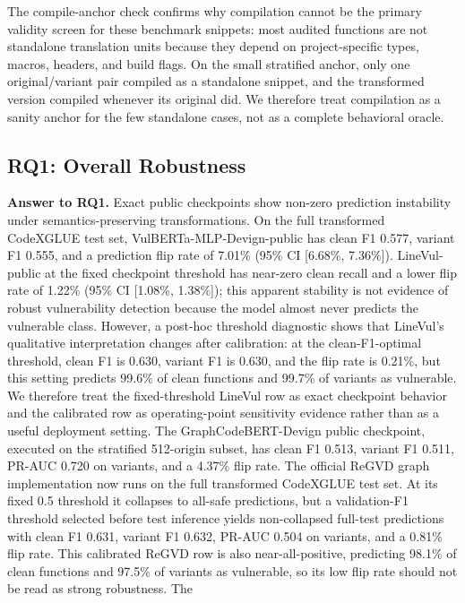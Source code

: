 \documentclass[a4paper,fleqn]{cas-dc}
\begin{document}
The compile-anchor check confirms why compilation cannot be the primary
validity screen for these benchmark snippets: most audited functions are not
standalone translation units because they depend on project-specific types,
macros, headers, and build flags. On the small stratified anchor, only one
original/variant pair compiled as a standalone snippet, and the transformed
version compiled whenever its original did. We therefore treat compilation as
a sanity anchor for the few standalone cases, not as a complete behavioral
oracle.

\subsection{RQ1: Overall Robustness}

\textbf{Answer to RQ1.} Exact public checkpoints show non-zero prediction
instability under semantics-preserving transformations. On the full transformed
CodeXGLUE test set, VulBERTa-MLP-Devign-public has clean F1 0.577,
variant F1 0.555, and a prediction flip rate of 7.01\% (95\% CI [6.68\%,
7.36\%]). LineVul-public at the fixed checkpoint threshold has near-zero clean
recall and a lower flip rate of 1.22\% (95\% CI [1.08\%, 1.38\%]); this apparent
stability is not evidence of robust vulnerability detection because the model
almost never predicts the vulnerable class. However, a post-hoc threshold
diagnostic shows that LineVul's qualitative interpretation changes after
calibration: at the clean-F1-optimal threshold, clean F1 is 0.630, variant F1
is 0.630, and the flip rate is 0.21\%, but this setting predicts 99.6\% of
clean functions and 99.7\% of variants as vulnerable. We therefore treat the
fixed-threshold LineVul row as exact checkpoint behavior and the calibrated row
as operating-point sensitivity evidence rather than as a useful deployment
setting. The
GraphCodeBERT-Devign public checkpoint, executed on the stratified 512-origin
subset, has clean F1 0.513, variant F1 0.511, PR-AUC 0.720 on variants, and a
4.37\% flip rate. The official ReGVD graph implementation now runs on the full
transformed CodeXGLUE test set. At its fixed 0.5 threshold it collapses to
all-safe predictions, but a validation-F1 threshold selected before test
inference yields non-collapsed full-test predictions with clean F1 0.631,
variant F1 0.632, PR-AUC 0.504 on variants, and a 0.81\% flip rate. This
calibrated ReGVD row is also near-all-positive, predicting 98.1\% of clean
functions and 97.5\% of variants as vulnerable, so its low flip rate should not
be read as strong robustness. The
\end{document}
